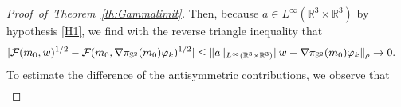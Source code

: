 \documentclass[reqno,11pt]{amsart}
\numberwithin{equation}{section}
\theoremstyle{thmlemcorr}
\numberwithin{theorem}{section}
\theoremstyle{thmlemcorr*}
\theoremstyle{defi}
\theoremstyle{remexample}
\theoremstyle{ass}
\newcommand{\R}{\mathbb{R}}
\renewcommand{\S}{\mathbb{S}}
\newcommand{\dd}{\,\mathrm{d}}
\DeclarePairedDelimiter{\abs}{\lvert}{\rvert}
\DeclarePairedDelimiter{\norm}{\lVert}{\rVert}
\newcommand{\1}{\mathds{1}}
\newcommand{\Om}{\Omega}
\newcommand{\dl}{\,\mathrm{d}}
\begin{document}
\begin{proof}[Proof~of~Theorem~\ref{th:Gammalimit}]
Then, because \(a \in L^{\infty}(\R^3 \times \R^3)\) by hypothesis \ref{H1}, we find with the reverse triangle inequality that
 \begin{align}\label{eq:symm_diff_van}
    |\mathcal{F}(m_0,w)&^{1/2}-\mathcal{F}(m_0,\nabla\pi_{\S^2}(m_0)\varphi_k)^{1/2}|
    \le \norm{a}_{L^{\infty}(\R^3 \times \R^3)}
    \norm{w-\nabla\pi_{\S^2}(m_0)\varphi_k}_\rho
    \to 0.
 \end{align}
 To estimate the difference of the antisymmetric contributions, we observe that \begin{align}

\end{align}
\end{proof}
\end{document}
